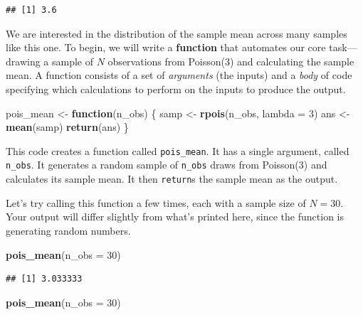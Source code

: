 \documentclass[
  12pt,
  oneside,openany]{book}
\newenvironment{Shaded}{\begin{snugshade}}{\end{snugshade}}
\newcommand{\ControlFlowTok}[1]{\textcolor[rgb]{0.13,0.29,0.53}{\textbf{#1}}}
\newcommand{\DataTypeTok}[1]{\textcolor[rgb]{0.13,0.29,0.53}{#1}}
\newcommand{\DecValTok}[1]{\textcolor[rgb]{0.00,0.00,0.81}{#1}}
\newcommand{\KeywordTok}[1]{\textcolor[rgb]{0.13,0.29,0.53}{\textbf{#1}}}
\newcommand{\NormalTok}[1]{#1}
\newcommand{\StringTok}[1]{\textcolor[rgb]{0.31,0.60,0.02}{#1}}
\begin{document}
\begin{verbatim}
## [1] 3.6
\end{verbatim}

We are interested in the distribution of the sample mean across many samples like this one. To begin, we will write a \textbf{function} that automates our core task---drawing a sample of \(N\) observations from Poisson(3) and calculating the sample mean. A function consists of a set of \emph{arguments} (the inputs) and a \emph{body} of code specifying which calculations to perform on the inputs to produce the output.

\begin{Shaded}
\begin{Highlighting}[]
\NormalTok{pois\_mean <{-}}\StringTok{ }\ControlFlowTok{function}\NormalTok{(n\_obs) \{}
\NormalTok{  samp <{-}}\StringTok{ }\KeywordTok{rpois}\NormalTok{(n\_obs, }\DataTypeTok{lambda =} \DecValTok{3}\NormalTok{)}
\NormalTok{  ans <{-}}\StringTok{ }\KeywordTok{mean}\NormalTok{(samp)}
  \KeywordTok{return}\NormalTok{(ans)}
\NormalTok{\}}
\end{Highlighting}
\end{Shaded}

This code creates a function called \texttt{pois\_mean}. It has a single argument, called \texttt{n\_obs}. It generates a random sample of \texttt{n\_obs} draws from Poisson(3) and calculates its sample mean. It then \texttt{return}s the sample mean as the output.

Let's try calling this function a few times, each with a sample size of \(N = 30\). Your output will differ slightly from what's printed here, since the function is generating random numbers.

\begin{Shaded}
\begin{Highlighting}[]
\KeywordTok{pois\_mean}\NormalTok{(}\DataTypeTok{n\_obs =} \DecValTok{30}\NormalTok{)}
\end{Highlighting}
\end{Shaded}

\begin{verbatim}
## [1] 3.033333
\end{verbatim}

\begin{Shaded}
\begin{Highlighting}[]
\KeywordTok{pois\_mean}\NormalTok{(}\DataTypeTok{n\_obs =} \DecValTok{30}\NormalTok{)}
\end{Highlighting}
\end{Shaded}
\end{document}
